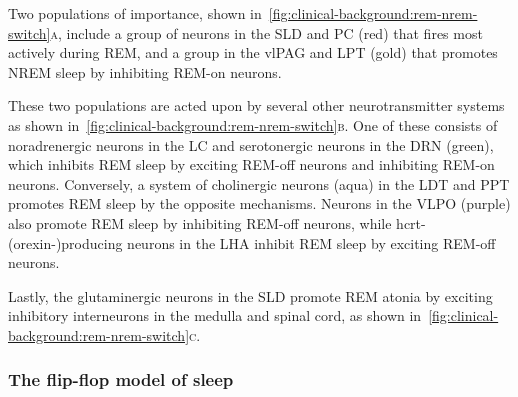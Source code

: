             Two populations of importance, shown in~\cref{fig:clinical-background:rem-nrem-switch}\textsc{\textsf{a}}, include a group of neurons in the \ac{SLD} and \ac{PC} (red) that fires most actively during \ac{REM}, and a group in the \ac{vlPAG} and \ac{LPT} (gold) that promotes \ac{NREM} sleep by inhibiting \ac{REM}-on neurons.
            
            These two populations are acted upon by several other neurotransmitter systems as shown in~\cref{fig:clinical-background:rem-nrem-switch}\textsc{\textsf{b}}.
            One of these consists of noradrenergic neurons in the \ac{LC} and serotonergic neurons in the \ac{DRN} (green), which inhibits \ac{REM} sleep by exciting \ac{REM}-off neurons and inhibiting \ac{REM}-on neurons.
            Conversely, a system of cholinergic neurons (aqua) in the \ac{LDT} and \ac{PPT} promotes \ac{REM} sleep by the opposite mechanisms.
            Neurons in the \ac{VLPO} (purple) also promote \ac{REM} sleep by inhibiting \ac{REM}-off neurons, while \ac{hcrt}-(orexin-)producing neurons in the \ac{LHA} inhibit \ac{REM} sleep by exciting \ac{REM}-off neurons.
            
            Lastly, the glutaminergic neurons in the \ac{SLD} promote \ac{REM} atonia by exciting inhibitory interneurons in the medulla and spinal cord, as shown in~\cref{fig:clinical-background:rem-nrem-switch}\textsc{\textsf{c}}.
            
            
            \subsubsection{The flip-flop model of sleep}
            
